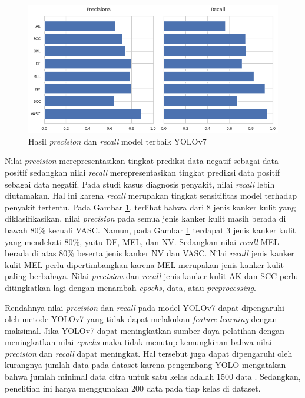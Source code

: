 \begin{figure}[H]
    \begin{center}
        \includegraphics[width=12cm]{img/bab4/pr-yolov7.png}
        \caption{Hasil \textit{precision} dan \textit{recall} model terbaik YOLOv7}
        \label{fig:d-pr-yolov7}
    \end{center}
\end{figure}

Nilai \textit{precision} merepresentasikan tingkat prediksi data negatif sebagai data positif sedangkan nilai \textit{recall} merepresentasikan tingkat prediksi data positif sebagai data negatif. Pada studi kasus diagnosis penyakit, nilai \textit{recall} lebih diutamakan. Hal ini karena \textit{recall} merupakan tingkat sensitifitas model terhadap penyakit tertentu. Pada Gambar \ref{fig:d-pr-yolov7}, terlihat bahwa dari 8 jenis kanker kulit yang diklasifikasikan, nilai \textit{precision} pada semua jenis kanker kulit masih berada di bawah $80\%$ kecuali VASC.  Namun, pada Gambar \ref{fig:d-pr-yolov7} terdapat 3 jenis kanker kulit yang mendekati $80\%$, yaitu DF, MEL, dan NV. Sedangkan nilai \textit{recall} MEL berada di atas $80\%$ beserta jenis kanker NV dan VASC. Nilai \textit{recall} jenis kanker kulit MEL perlu dipertimbangkan karena MEL merupakan jenis kanker kulit paling berbahaya. Nilai \textit{precision} dan \textit{recall} jenis kanker kulit AK dan SCC perlu ditingkatkan lagi dengan menambah \textit{epochs}, data, atau \textit{preprocessing}.

Rendahnya nilai \textit{precision} dan \textit{recall} pada model YOLOv7 dapat dipengaruhi oleh metode YOLOv7 yang tidak dapat melakukan \textit{feature learning} dengan maksimal. Jika YOLOv7 dapat meningkatkan sumber daya pelatihan dengan meningkatkan nilai \textit{epochs} maka tidak menutup kemungkinan bahwa nilai \textit{precision} dan \textit{recall} dapat meningkat. Hal tersebut juga dapat dipengaruhi oleh kurangnya jumlah data pada dataset karena pengembang YOLO mengatakan bahwa jumlah minimal data citra untuk satu kelas adalah 1500 data \citep{Jocher2020}. Sedangkan, penelitian ini hanya menggunakan 200 data pada tiap kelas di dataset. 

